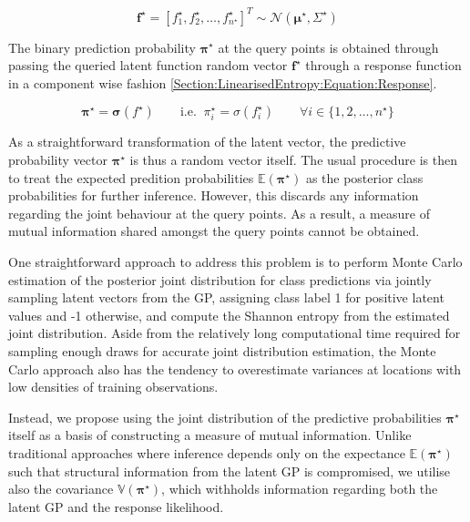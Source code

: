 \documentclass{article}
\renewcommand{\vec}[1]{\boldsymbol{#1}}
\begin{document}
		\begin{equation}
			\vec{f}^{\star} = [f^{\star}_{1}, f^{\star}_{2}, \dots, f^{\star}_{n^{\star}}]^{T} \sim \mathcal{N}(\vec{\mu}^{\star}, \Sigma^{\star})
		\label{Section:LinearisedEntropy:Equation:PredictiveGaussianDistribution}
		\end{equation}
			
		The binary prediction probability $\vec{\pi^{\star}}$ at the query points is obtained through passing the queried latent function random vector $\vec{f}^{\star}$ through a response function in a component wise fashion \eqref{Section:LinearisedEntropy:Equation:Response}.
		
		\begin{equation}
			\vec{\pi}^{\star} = \vec{\sigma}(f^{\star})\mathrm{ \qquad i.e. \;\;}\pi^{\star}_{i} = \sigma(f^{\star}_{i}) \qquad \forall i \in \{1, 2, \dots, n^{\star}\}
		\label{Section:LinearisedEntropy:Equation:Response}
		\end{equation}
		
		As a straightforward transformation of the latent vector, the predictive probability vector $\vec{\pi^{\star}}$ is thus a random vector itself. The usual procedure is then to treat the expected predition probabilities $\mathbb{E}(\vec{\pi^{\star}})$ as the posterior class probabilities for further inference. However, this discards any information regarding the joint behaviour at the query points. As a result, a measure of mutual information shared amongst the query points cannot be obtained.
		
		One straightforward approach to address this problem is to perform Monte Carlo estimation of the posterior joint distribution for class predictions via jointly sampling latent vectors from the GP, assigning class label 1 for positive latent values and -1 otherwise, and compute the Shannon entropy \cite{ShannonEntropy} from the estimated joint distribution. Aside from the relatively long computational time required for sampling enough draws for accurate joint distribution estimation, the Monte Carlo approach also has the tendency to overestimate variances at locations with low densities of training observations.
				
		Instead, we propose using the joint distribution of the predictive probabilities $\vec{\pi^{\star}}$ itself as a basis of constructing a measure of mutual information. Unlike traditional approaches where inference depends only on the expectance $\mathbb{E}(\vec{\pi^{\star}})$ such that structural information from the latent GP is compromised, we utilise also the covariance $\mathbb{V}(\vec{\pi^{\star}})$, which withholds information regarding both the latent GP and the response likelihood.
	
\end{document}

